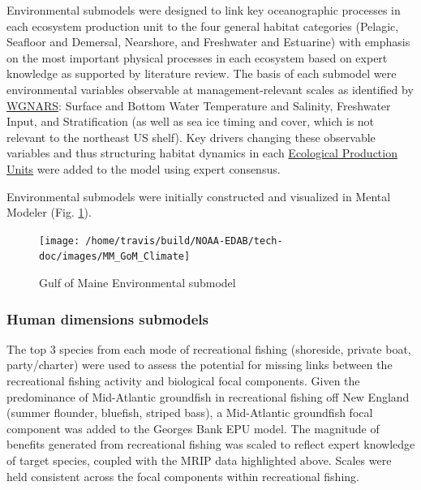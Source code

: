 \documentclass[
]{book}
\begin{document}
Environmental submodels were designed to link key oceanographic processes in each ecosystem production unit to the four general habitat categories (Pelagic, Seafloor and Demersal, Nearshore, and Freshwater and Estuarine) with emphasis on the most important physical processes in each ecosystem based on expert knowledge as supported by literature review. The basis of each submodel were environmental variables observable at management-relevant scales as identified by \href{http://ices.dk/sites/pub/Publication\%20Reports/Expert\%20Group\%20Report/SSGRSP/2014/WGNARS14.pdf}{WGNARS}: Surface and Bottom Water Temperature and Salinity, Freshwater Input, and Stratification (as well as sea ice timing and cover, which is not relevant to the northeast US shelf). Key drivers changing these observable variables and thus structuring habitat dynamics in each \protect\hyperlink{epu}{Ecological Production Units} were added to the model using expert consensus.

Environmental submodels were initially constructed and visualized in Mental Modeler (Fig. \ref{fig:draftGOMenv}).

\begin{figure}
\texttt{[image: /home/travis/build/NOAA-EDAB/tech-doc/images/MM\_GoM\_Climate]} \caption{Gulf of Maine Environmental submodel}\label{fig:draftGOMenv}
\end{figure}

\hypertarget{human-dimensions-submodels-2}{%
\subsubsection{Human dimensions submodels}\label{human-dimensions-submodels-2}}

The top 3 species from each mode of recreational fishing (shoreside, private boat, party/charter) were used to assess the potential for missing links between the recreational fishing activity and biological focal components. Given the predominance of Mid-Atlantic groundfish in recreational fishing off New England (summer flounder, bluefish, striped bass), a Mid-Atlantic groundfish focal component was added to the Georges Bank EPU model. The magnitude of benefits generated from recreational fishing was scaled to reflect expert knowledge of target species, coupled with the MRIP data highlighted above. Scales were held consistent across the focal components within recreational fishing.
\end{document}
